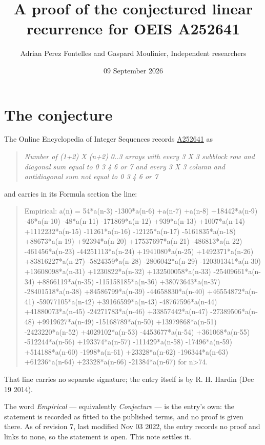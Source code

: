 \documentclass[11pt]{article}
\title{A proof of the conjectured linear recurrence for OEIS A252641}
\author{Adrian Perez Fontelles and Gaspard Moulinier, Independent researchers}
\date{09 September 2026}
\theoremstyle{definition}
\begin{document}
\maketitle
\section{The conjecture}

The Online Encyclopedia of Integer Sequences records \href{https://oeis.org/A252641}{A252641} as

\begin{quote}\itshape Number of (1+2) X (n+2) 0..3 arrays with every 3 X 3 subblock row and diagonal sum equal to 0 3 4 6 or 7 and every 3 X 3 column and antidiagonal sum not equal to 0 3 4 6 or 7\end{quote}

and carries in its Formula section the line:

\begin{quote}\ttfamily Empirical: a(n) = 54*a(n-3) -1300*a(n-6) +a(n-7) +a(n-8) +18442*a(n-9) -46*a(n-10) -48*a(n-11) -171869*a(n-12) +939*a(n-13) +1007*a(n-14) +1112232*a(n-15) -11261*a(n-16) -12125*a(n-17) -5161835*a(n-18) +88673*a(n-19) +92394*a(n-20) +17537697*a(n-21) -486813*a(n-22) -461456*a(n-23) -44251113*a(n-24) +1941080*a(n-25) +1492371*a(n-26) +83816227*a(n-27) -5824359*a(n-28) -2806042*a(n-29) -120301341*a(n-30) +13608098*a(n-31) +1230822*a(n-32) +132500058*a(n-33) -25409661*a(n-34) +8866119*a(n-35) -115158185*a(n-36) +38073643*a(n-37) -28401518*a(n-38) +84586799*a(n-39) -44658830*a(n-40) +46554872*a(n-41) -59077105*a(n-42) +39166599*a(n-43) -48767596*a(n-44) +41880073*a(n-45) -24271783*a(n-46) +33857442*a(n-47) -27389506*a(n-48) +9919627*a(n-49) -15168789*a(n-50) +13979868*a(n-51) -2423220*a(n-52) +4029102*a(n-53) -4453677*a(n-54) +361068*a(n-55) -512244*a(n-56) +193374*a(n-57) -111429*a(n-58) -17496*a(n-59) +514188*a(n-60) -1998*a(n-61) +23328*a(n-62) -196344*a(n-63) +61236*a(n-64) +23328*a(n-66) -21384*a(n-67) for n>74.\end{quote}

That line carries no separate signature; the entry itself is by R. H. Hardin (Dec 19 2014).

The word {\itshape Empirical} --- equivalently {\itshape Conjecture} --- is the entry's own: the statement is recorded as fitted to the published terms, and no proof is given there. As of revision 7, last modified Nov 03 2022, the entry records no proof and links to none, so the statement is open. This note settles it.
\end{document}
